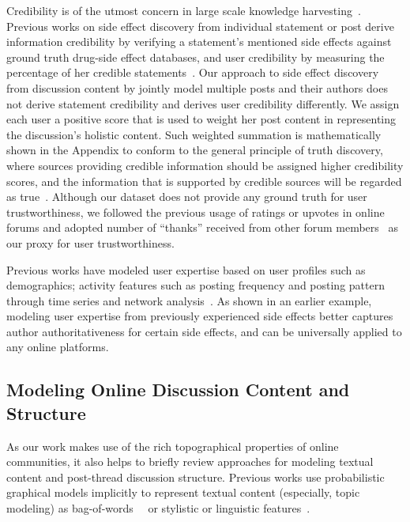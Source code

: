 \documentclass{bmcart}
\begin{document}
Credibility is of the utmost concern in large scale knowledge harvesting~\cite{hajli2015credibility,mukherjee2015leveraging,popat2016credibility}. Previous works on side effect discovery from individual statement or post derive information credibility by verifying a statement's mentioned side effects against ground truth drug-side effect databases, and user credibility by measuring the percentage of her credible statements~\cite{mukherjee2014people,li2017reliable}. Our approach to side effect discovery from discussion content by jointly model multiple posts and their authors does not derive statement credibility and derives user credibility differently. We assign each user a positive score that is used to weight her post content in representing the discussion's holistic content. Such weighted summation is mathematically shown in the Appendix to conform to the general principle of truth discovery, where sources providing credible information should be assigned higher credibility scores, and the information that is supported by credible sources will be
regarded as true~\cite{li2016survey}. Although our dataset does not provide any ground truth for user trustworthiness, we followed the previous usage of ratings or upvotes in online forums and adopted number of ``thanks'' received from other forum members~\cite{rains2009health} as our proxy for user trustworthiness.

Previous works have modeled user expertise based on user profiles such as demographics; activity features such as posting frequency and posting pattern through time series and network analysis~\cite{mukherjee2014people, vydiswaran2019identifying}. As shown in an earlier example, modeling user expertise from previously experienced side effects better captures author authoritativeness for certain side effects, and can be universally applied to any online platforms.

\subsection{Modeling Online Discussion Content and Structure}

As our work makes use of the rich topographical properties of online communities, it also helps to briefly review approaches for modeling textual content and post-thread discussion structure. Previous works use probabilistic graphical models implicitly to represent textual content (especially, topic modeling) as bag-of-words~\cite{yates2015extracting}~\cite{wang2014sideeffectptm} or stylistic or linguistic features~\cite{mukherjee2014people}. 
\end{document}
